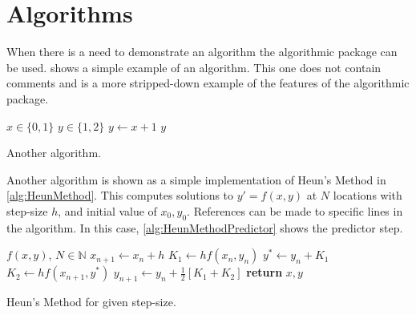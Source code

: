 \section{Algorithms} \label{sec:Algorithms}
    When there is a need to demonstrate an algorithm the algorithmic package can be used.
     shows a simple example of an algorithm.
    This one does not contain comments and is a more stripped-down example of the features of the algorithmic package.
    \begin{algorithm}
        \begin{algorithmic}
            \Require $x \in \{0,1\}$
            \Ensure $y \in \{1,2\}$
            \State $y \gets x+1$
            \State \Return $y$
        \end{algorithmic}
        \caption{Another algorithm.}
        \label{alg:SecondAlgorithm}
    \end{algorithm}

    Another algorithm is shown as a simple implementation of Heun's Method in \cref{alg:HeunMethod}.
    This computes solutions to $y'=f\left(x,y\right)$ at $N$ locations with step-size $h$, and initial value of $x_0, y_0$.
    References can be made to specific lines in the algorithm.
    In this case, \cref{alg:HeunMethodPredictor} shows the predictor step.
    \begin{algorithm}
        \begin{algorithmic}
            \Require $f\left(x,y\right)$, $N\in\mathbb{N}$
                    \State $x_{n+1}\gets x_n+h$
                    \State $K_1\gets hf\left(x_n, y_n\right)$
                    \State $y^*\gets y_n+K_1$ \label{alg:HeunMethodPredictor}
                    \State $K_2\gets hf\left(x_{n+1}, y^*\right)$
                    \State $y_{n+1}\gets y_n+\frac{1}{2}\left[K_1+K_2\right]$
                \EndFor
                \State \textbf{return} $x,y$ 
            \EndProcedure
        \end{algorithmic}
        \caption{Heun's Method for given step-size.}
        \label{alg:HeunMethod}
    \end{algorithm}

